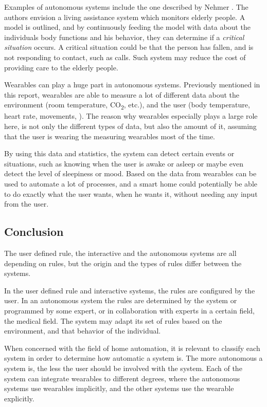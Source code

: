 Examples of autonomous systems include the one described by Nehmer \etal \cite{nehmer2006living}. 
The authors envision a living assistance system which monitors elderly people. 
A model is outlined, 
and by continuously feeding the model with data about the individuals body functions and his behavior, 
they can determine if a \emph{critical situation} occurs. 
A critical situation could be that the person has fallen, 
and is not responding to contact, such as calls.
Such system may reduce the cost of providing care to the elderly people.

Wearables can play a huge part in autonomous systems. 
Previously mentioned in this report, 
wearables are able to measure a lot of different data about the environment (room temperature, CO\textsubscript{2}, etc.), 
and the user (body temperature, heart rate, movements, \etc). 
The reason why wearables especially plays a large role here, 
is not only the different types of data, but also the amount of it,
assuming that the user is wearing the measuring wearables most of the time. 

By using this data and statistics, the system can detect certain events or situations, 
such as knowing when the user is awake or asleep or maybe even detect the level of sleepiness or mood.    
Based on the data from wearables can be used to automate a lot of processes, 
and a smart home could potentially be able to do exactly what the user wants, 
when he wants it, without needing any input from the user. 

\subsection{Conclusion}

The user defined rule, the interactive and the autonomous systems are all depending on rules, 
but the origin and the types of rules differ between the systems. 

In the user defined rule and interactive systems, the rules are configured by the user.
In an autonomous system the rules are determined by the system or programmed by some expert, 
or in collaboration with experts in a certain field, \eg the medical field. 
The system may adapt its set of rules based on the environment, 
and that behavior of the individual.

When concerned with the field of home automation, 
it is relevant to classify each system in order to determine how automatic a system is. 
The more autonomous a system is, 
the less the user should be involved with the system.
Each of the system can integrate wearables to different degrees, 
where the autonomous systems use wearables implicitly, 
and the other systems use the wearable explicitly.  

